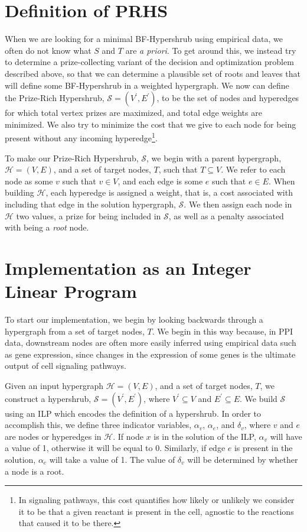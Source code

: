 \documentclass[12pt,twoside]{reedthesis}
\theoremstyle{definition}
\begin{document}
\section{Definition of PRHS}

When we are looking for a minimal BF-Hypershrub using empirical data, we often do not know what $S$ and $T$ are \textit{a priori}. To get around this, we instead try to determine a prize-collecting variant of the decision and optimization problem described above, so that we can determine a plausible set of roots and leaves that will define some BF-Hypershrub in a weighted hypergraph. We now can define the Prize-Rich Hypershrub, $\mathcal{S} = (V^\prime,E^\prime)$, to be the set of nodes and hyperedges for which total vertex prizes are maximized, and total edge weights are minimized. We also try to minimize the cost that we give to each node for being present without any incoming hyperedge\footnote{In signaling pathways, this cost quantifies how likely or unlikely we consider it to be that a given reactant is present in the cell, agnostic to the reactions that caused it to be there.}.

To make our Prize-Rich Hypershrub, $\mathcal{S}$, we begin with a parent hypergraph, $\mathcal{H} = (V,E)$, and a set of target nodes, $T$, such that $T \subseteq V$.  We refer to each node as some $v$ such that $v \in V$, and each edge is some $e$ such that $e \in E$.  When building $\mathcal{H}$, each hyperedge is assigned a weight, that is, a cost associated with including that edge in the solution hypergraph, $\mathcal{S}$.  We then assign each node in $\mathcal{H}$ two values, a prize for being included in $\mathcal{S}$, as well as a penalty associated with being a \textit{root} node.\par

\section{Implementation as an Integer Linear Program}

To start our implementation, we begin by looking backwards through a hypergraph from a set of target nodes, $T$. We begin in this way because, in PPI data, downstream nodes are often more easily inferred using empirical data such as gene expression, since changes in the expression of some genes is the ultimate output of cell signaling pathways.

Given an input hypergraph $\mathcal{H}=(V,E)$, and a set of target nodes, $T$, we construct a hypershrub, $\mathcal{S}= (V^\prime,E^\prime)$, where $V^\prime \subseteq V$ and $E^\prime \subseteq E$.  We build $\mathcal{S}$ using an ILP which encodes the definition of a hypershrub.  In order to accomplish this, we define three indicator variables, $\alpha_v$, $\alpha_e$, and $\delta_v$, where $v$ and $e$ are nodes or hyperedges in $\mathcal{H}$.  If node $x$ is in the solution of the ILP, $\alpha_v$ will have a value of 1, otherwise it will be equal to 0.  Similarly, if edge $e$ is present in the solution, $\alpha_e$ will take a value of 1. The value of $\delta_v$ will be determined by whether a node is a root.\par
\end{document}
